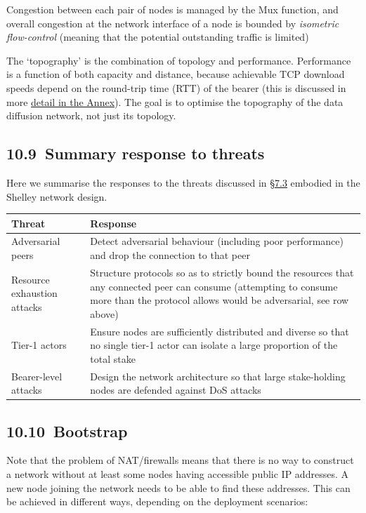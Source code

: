 \documentclass[11pt,a4paper]{article}
\begin{document}
Congestion between each pair of nodes is managed by the Mux function,
and overall congestion at the network interface of a node is bounded by
\emph{isometric flow-control} (meaning that the potential outstanding
traffic is limited)

The `topography' is the combination of topology and performance.
Performance is a function of both capacity and distance, because
achievable TCP download speeds depend on the round-trip time (RTT) of
the bearer (this is discussed in more
\protect\hyperlink{tcp-rpc-response-behavior}{{detail in the Annex}}).
The goal is to optimise the topography of the data diffusion network,
not just its topology.

\hypertarget{summary-response-to-threats}{%
\subsection{​10.9​~Summary response to
threats}\label{summary-response-to-threats}}

Here we summarise the responses to the threats discussed in
\protect\hyperlink{high-level-threat-model}{{§7.3}} embodied in the
Shelley network design.

\begin{longtable}[]{@{}ll@{}}
\toprule
\textbf{Threat} & \textbf{Response}\tabularnewline
\midrule
\endhead
Adversarial peers & Detect adversarial behaviour (including poor
performance) and drop the connection to that peer\tabularnewline
Resource exhaustion attacks & Structure protocols so as to strictly
bound the resources that any connected peer can consume (attempting to
consume more than the protocol allows would be adversarial, see row
above)\tabularnewline
Tier-1 actors & Ensure nodes are sufficiently distributed and diverse so
that no single tier-1 actor can isolate a large proportion of the total
stake\tabularnewline
Bearer-level attacks & Design the network architecture so that large
stake-holding nodes are defended against DoS attacks\tabularnewline
\bottomrule
\end{longtable}

\hypertarget{bootstrap}{%
\subsection{​10.10​~Bootstrap}\label{bootstrap}}

Note that the problem of NAT/firewalls means that there is no way to
construct a network without at least some nodes having accessible public
IP addresses. A new node joining the network needs to be able to find
these addresses. This can be achieved in different ways, depending on
the deployment scenarios:
\end{document}
